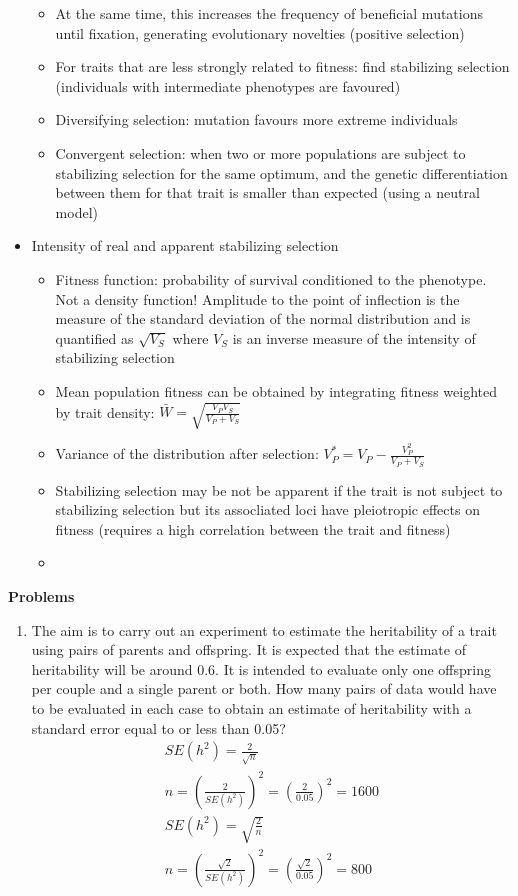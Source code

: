 \documentclass[12pt]{amsart}
\begin{document}
\begin{itemize}
\begin{itemize}
\item At the same time, this increases the frequency of beneficial mutations until fixation, generating evolutionary novelties (positive selection)
\item For traits that are less strongly related to fitness: find stabilizing selection (individuals with intermediate phenotypes are favoured)
\item Diversifying selection: mutation favours more extreme individuals 
\item Convergent selection: when two or more populations are subject to stabilizing selection for the same optimum, and the genetic differentiation between them for that trait is smaller than expected (using a neutral model) 
\end{itemize}
\item Intensity of real and apparent stabilizing selection
\begin{itemize}
\item Fitness function: probability of survival conditioned to the phenotype. Not a density function! Amplitude to the point of inflection is the measure of the standard deviation of the normal distribution and is quantified as $\sqrt{V_S}$ where $V_S$ is an inverse measure of the intensity of stabilizing selection 
\item Mean population fitness can be obtained by integrating fitness weighted by trait density: $\bar{W} = \sqrt{\frac{V_PV_S}{V_P + V_S}}$
\item Variance of the distribution after selection: $V_P^* = V_P - \frac{V_P^2}{V_P + V_S}$
\item Stabilizing selection may be not be apparent if the trait is not subject to stabilizing selection but its assocliated loci have pleiotropic effects on fitness (requires a high  correlation between the trait and fitness)
\item 
\end{itemize}
\end{itemize}

{\large \bf Problems}   
\begin{enumerate}
\item The aim is to carry out an experiment to estimate the heritability of a trait using pairs of parents and offspring. It is expected that the estimate of heritability will be around 0.6. It is intended to evaluate only one offspring per couple and a single parent or both. How many pairs of data would have to be evaluated in each case to obtain an estimate of heritability with a standard error equal to or less than 0.05?
\begin{gather*}
SE(h^2) = \frac{2}{\sqrt{n}} \\
n = (\frac{2}{SE(h^2)})^2 = (\frac{2}{0.05})^2 = 1600\\
SE(h^2) = \sqrt{\frac{2}{n}}\\
n = (\frac{\sqrt{2}}{SE(h^2)})^2 = (\frac{\sqrt{2}}{0.05})^2 = 800
\end{gather*}

\end{enumerate}
\end{document}
